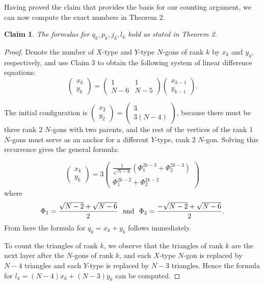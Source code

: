 \documentclass[11pt, oneside]{article}   	%
\newtheorem{claim}{Claim}
\begin{document}
Having proved the claim that provides the basis for our counting argument, we can now compute the exact numbers in Theorem 2. 
\begin{claim}
The formulas for $q_k,p_k,j_k,l_k$ hold as stated in Theorem 2.
\end{claim}
\begin{proof}

Denote the number of $X$-type and $Y$-type $N$-gons of rank $k$ by $x_k$ and $y_k$, respectively, and use Claim 3 to obtain the following system of linear difference equations:
\[\left(\begin{array}{c}
x_k \\
y_k
\end{array}\right)=\left(\begin{array}{cc}
1&1 \\
N-6 & N-5
\end{array}\right)\left(\begin{array}{c}
x_{k-1} \\
y_{k-1}
\end{array}\right).\] 

The initial configuration is $\left(\begin{array}{c}
x_2 \\
y_2
\end{array}\right)=\left(\begin{array}{c}
3 \\
3(N-4)
\end{array}\right)$, because there must be three rank 2 $N$-gons with two parents, and the rest of the vertices of the rank 1 $N$-gons must serve as an anchor for a different $Y$-type, rank 2 $N$-gon. Solving this recurrence gives the general formula:

\[\left(\begin{array}{c}
x_k \\
y_k
\end{array}\right)=3\left(\begin{array}{c}
\frac{1}{\sqrt{N-6}}(\Phi_1^{2k-3}+\Phi_2^{2k-3}) \\
\Phi_1^{2k-2}+\Phi_2^{2k-2}
\end{array}\right)\]
where 
$$\Phi_1=\frac{\sqrt{N-2}+\sqrt{N-6}}{2}\ \ {\rm and}\ \ \Phi_2=\frac{-\sqrt{N-2}+\sqrt{N-6}}{2}.$$
 From here the formula for $q_k=x_k+y_k$ follows immediately. 

To count the triangles of rank $k$, we observe that the triangles of rank $k$ are the next layer after the $N$-gons of rank $k$, and each $X$-type $N$-gon is replaced by $N-4$ triangles and each $Y$-type is replaced by $N-3$ triangles. Hence the formula for $l_k=(N-4) x_k+ (N-3) y_k$ can be computed.


\end{proof}
\end{document}
